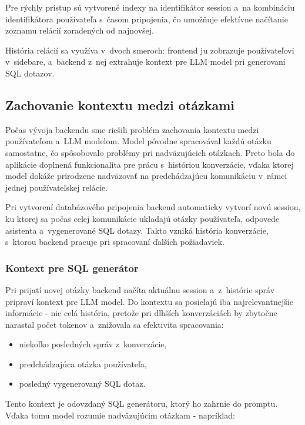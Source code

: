 \documentclass[a4paper, 12pt]{article}
\begin{document}
Pre rýchly prístup sú vytvorené indexy na identifikátor session a~na kombináciu identifikátora používateľa s~časom pripojenia, čo umožňuje efektívne načítanie zoznamu relácií zoradených od najnovšej.

História relácií sa využíva v~dvoch smeroch: frontend ju zobrazuje používateľovi v~sidebare, a~backend z~nej extrahuje kontext pre LLM model pri generovaní SQL dotazov.

\subsection{Zachovanie kontextu medzi otázkami}

Počas vývoja backendu sme riešili problém zachovania kontextu medzi používateľom a~LLM modelom. Model pôvodne spracovával každú otázku samostatne, čo spôsobovalo problémy pri nadväzujúcich otázkach. Preto bola do aplikácie doplnená funkcionalita pre prácu s~históriou konverzácie, vďaka ktorej model dokáže prirodzene nadväzovať na predchádzajúcu komunikáciu v~rámci jednej používateľskej relácie.

Pri vytvorení databázového pripojenia backend automaticky vytvorí novú session, ku ktorej sa počas celej komunikácie ukladajú otázky používateľa, odpovede asistenta a~vygenerované SQL dotazy. Takto vzniká história konverzácie, s~ktorou backend pracuje pri spracovaní ďalších požiadaviek.

\subsubsection{Kontext pre SQL generátor}

Pri prijatí novej otázky backend načíta aktuálnu session a~z~histórie správ pripraví kontext pre LLM model. Do kontextu sa posielajú iba najrelevantnejšie informácie - nie celá história, pretože pri dlhších konverzáciách by zbytočne narastal počet tokenov a~znižovala sa efektivita spracovania:

\begin{itemize}
    \item niekoľko posledných správ z~konverzácie,
    \item predchádzajúca otázka používateľa,
    \item posledný vygenerovaný SQL dotaz.
\end{itemize}

Tento kontext je odovzdaný SQL generátoru, ktorý ho zahrnie do promptu. Vďaka tomu model rozumie nadväzujúcim otázkam - napríklad:
\end{document}
